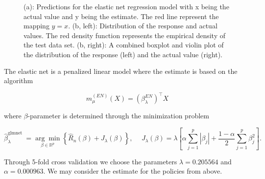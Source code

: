 \documentclass[
]{article}
\begin{document}
\begin{figure}[h]
    \centering
    \qquad
    \caption{(a): Predictions for the elastic net regression model with x being the actual value and y being the estimate. The red line represent the mapping $y=x$. (b, left): Distribution of the response and actual values. The red density function represents the empirical density of the test data set. (b, right): A combined boxplot and violin plot of the distribution of the response (left) and the actual value (right).}
\end{figure}

The elastic net is a penalized linear model where the estimate is based
on the algorithm

\[
m^{(EN)}_\mu(X)=\left(\beta_\lambda^{EN }\right)^\top X
\]

where \(\beta\)-parameter is determined through the minimization problem

\[
\hat{\beta}_\lambda^{\text {glmnet }} =\underset{\beta \in \mathbb{R}^p}{\arg \min }\left\{\hat{R}_n(\beta)+J_\lambda(\beta)\right\},\hspace{15pt}J_\lambda(\beta)=\lambda \left[\alpha\sum_{j=1}^p\left|\beta_j\right|+\frac{1-\alpha}{2}\sum_{j=1}^p\beta_j^2\right].
\]

Through 5-fold cross validation we choose the parameters
\(\lambda = 0.205564\) and \(\alpha = 0.000963\). We may consider the
estimate for the policies from above.
\end{document}
